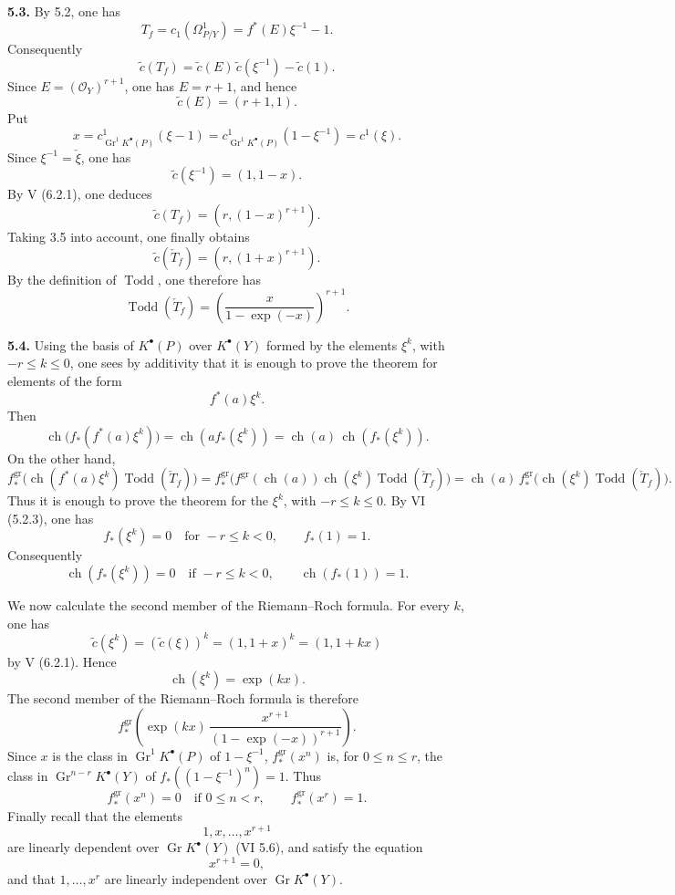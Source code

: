 \documentclass[11pt]{article}
\newcommand{\Gr}{\operatorname{Gr}}
\newcommand{\ch}{\operatorname{ch}}
\newcommand{\Todd}{\operatorname{Todd}}
\providecommand{\ch}{\operatorname{ch}}
\providecommand{\Todd}{\operatorname{Todd}}
\providecommand{\Gr}{\operatorname{Gr}}
\providecommand{\Gr}{\operatorname{G}}
\begin{document}
\textbf{5.3.} By 5.2, one has
\[
 T_f=c_1(\Omega^1_{P/Y})=f^*(E)\xi^{-1}-1.
\]
Consequently
\[
 \widetilde c(T_f)=\widetilde c(E)\,\widetilde c(\xi^{-1})-\widetilde c(1).
\]
Since \(E=(\mathcal O_Y)^{r+1}\), one has \(E=r+1\), and hence
\[
 \widetilde c(E)=(r+1,1).
\]
Put
\[
 x=c^1_{\Gr^1K^{\bullet}(P)}(\xi-1)
 =
 c^1_{\Gr^1K^{\bullet}(P)}(1-\xi^{-1})
 =
 c^1(\xi).
\]
Since \(\xi^{-1}=\check \xi\), one has
\[
 \widetilde c(\xi^{-1})=(1,1-x).
\]
By V (6.2.1), one deduces
\[
 \widetilde c(T_f)=(r,(1-x)^{r+1}).
\]
Taking 3.5 into account, one finally obtains
\[
 \widetilde c(\check T_f)=(r,(1+x)^{r+1}).
\]
By the definition of \(\Todd\), one therefore has
\begin{equation}\tag{5.3.1}
 \Todd(\check T_f)=
 \left(\frac{x}{1-\exp(-x)}\right)^{r+1}.
\end{equation}

\textbf{5.4.} Using the basis of \(K^{\bullet}(P)\) over \(K^{\bullet}(Y)\) formed by the elements \(\xi^k\), with \(-r\leq k\leq0\), one sees by additivity that it is enough to prove the theorem for elements of the form
\[
 f^*(a)\xi^k .
\]
Then
\[
 \ch\bigl(f_*(f^*(a)\xi^k)\bigr)
 =
 \ch(a f_*(\xi^k))
 =
 \ch(a)\,\ch(f_*(\xi^k)).
\]
On the other hand,
\[
 f^{\mathrm{gr}}_*\bigl(\ch(f^*(a)\xi^k)\Todd(\check T_f)\bigr)
 =
 f^{\mathrm{gr}}_*\bigl(f^{\mathrm{gr}}(\ch(a))\ch(\xi^k)\Todd(\check T_f)\bigr)
 =
 \ch(a)\,f^{\mathrm{gr}}_*\bigl(\ch(\xi^k)\Todd(\check T_f)\bigr).
\]
Thus it is enough to prove the theorem for the \(\xi^k\), with \(-r\leq k\leq0\). By VI (5.2.3), one has
\[
 f_*(\xi^k)=0\quad\text{for }-r\leq k<0,\qquad f_*(1)=1.
\]
Consequently
\begin{equation}\tag{5.4.1}
 \ch(f_*(\xi^k))=0\quad\text{if }-r\leq k<0,\qquad
 \ch(f_*(1))=1.
\end{equation}

We now calculate the second member of the Riemann--Roch formula. For every \(k\), one has
\[
 \widetilde c(\xi^k)=(\widetilde c(\xi))^k=(1,1+x)^k=(1,1+kx)
\]
by V (6.2.1). Hence
\begin{equation}\tag{5.4.2}
 \ch(\xi^k)=\exp(kx).
\end{equation}
The second member of the Riemann--Roch formula is therefore
\begin{equation}\tag{5.4.3}
 f^{\mathrm{gr}}_*\left(\exp(kx)\,
 \frac{x^{r+1}}{(1-\exp(-x))^{r+1}}\right).
\end{equation}
Since \(x\) is the class in \(\Gr^1K^{\bullet}(P)\) of \(1-\xi^{-1}\), \(f^{\mathrm{gr}}_*(x^n)\) is, for \(0\leq n\leq r\), the class in
\(\Gr^{n-r}K^{\bullet}(Y)\) of \(f_*((1-\xi^{-1})^n)=1\). Thus
\begin{equation}\tag{5.4.4}
 f^{\mathrm{gr}}_*(x^n)=0\quad\text{if }0\leq n<r,\qquad
 f^{\mathrm{gr}}_*(x^r)=1.
\end{equation}
Finally recall that the elements
\[
1,x,\ldots,x^{r+1}
\]
are linearly dependent over \(\Gr K^{\bullet}(Y)\) (VI 5.6), and satisfy the equation
\begin{equation}\tag{5.4.5}
 x^{r+1}=0,
\end{equation}
and that \(1,\ldots,x^r\) are linearly independent over \(\Gr K^{\bullet}(Y)\).
\end{document}

